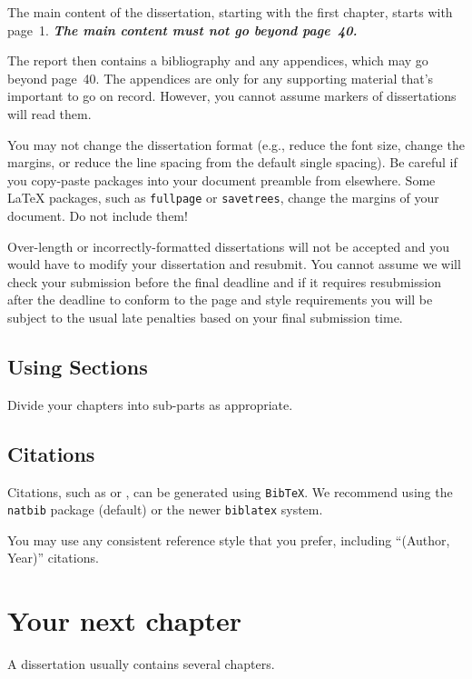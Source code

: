 \documentclass[logo,bsc,singlespacing,parskip]{infthesis}
\theoremstyle{definition}
\theoremstyle{example}
\theoremstyle{theorem}
\theoremstyle{theorem}
\theoremstyle{theorem}
\theoremstyle{definition}
\theoremstyle{definition}
\theoremstyle{definition}
\begin{document}
The main content of the dissertation, starting with the first chapter,
starts with page~1. \emph{\textbf{The main content must not go beyond page~40.}}

The report then contains a bibliography and any appendices, which may go beyond
page~40. The appendices are only for any supporting material that's important to
go on record. However, you cannot assume markers of dissertations will read them.

You may not change the dissertation format (e.g., reduce the font size, change
the margins, or reduce the line spacing from the default single spacing). Be
careful if you copy-paste packages into your document preamble from elsewhere.
Some \LaTeX{} packages, such as \texttt{fullpage} or \texttt{savetrees}, change
the margins of your document. Do not include them!

Over-length or incorrectly-formatted dissertations will not be accepted and you
would have to modify your dissertation and resubmit. You cannot assume we will
check your submission before the final deadline and if it requires resubmission
after the deadline to conform to the page and style requirements you will be
subject to the usual late penalties based on your final submission time.

\section{Using Sections}

Divide your chapters into sub-parts as appropriate.

\section{Citations}

Citations, such as \citet{P1} or \citep{P2}, can be generated using
\texttt{BibTeX}. We recommend using the \texttt{natbib} package (default) or the newer \texttt{biblatex} system. 

You may use any consistent reference style that you prefer, including ``(Author, Year)'' citations. 



\chapter{Your next chapter}

A dissertation usually contains several chapters.
\end{document}
